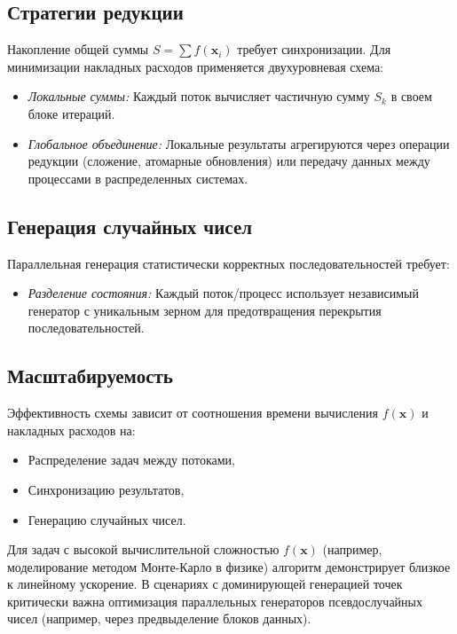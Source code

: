 \documentclass[a4paper,12pt]{article}
\begin{document}
\subsection{Стратегии редукции}
Накопление общей суммы \( S = \sum f(\mathbf{x}_i) \) требует синхронизации. Для минимизации накладных расходов применяется двухуровневая схема:
\begin{itemize}
\item \textit{Локальные суммы:} Каждый поток вычисляет частичную сумму \( S_k \) в своем блоке итераций.
\item \textit{Глобальное объединение:} Локальные результаты агрегируются через операции редукции (сложение, атомарные обновления) или передачу данных между процессами в распределенных системах.
\end{itemize}

\subsection{Генерация случайных чисел}
Параллельная генерация статистически корректных последовательностей требует:
\begin{itemize}
\item \textit{Разделение состояния:} Каждый поток/процесс использует независимый генератор с уникальным зерном для предотвращения перекрытия последовательностей.
\end{itemize}

\subsection{Масштабируемость}
Эффективность схемы зависит от соотношения времени вычисления \( f(\mathbf{x}) \) и накладных расходов на:
\begin{itemize}
\item Распределение задач между потоками,
\item Синхронизацию результатов,
\item Генерацию случайных чисел.
\end{itemize}

Для задач с высокой вычислительной сложностью \( f(\mathbf{x}) \) (например, моделирование методом Монте-Карло в физике) алгоритм демонстрирует близкое к линейному ускорение. В сценариях с доминирующей генерацией точек критически важна оптимизация параллельных генераторов псевдослучайных чисел (например, через предвыделение блоков данных). 

\newpage
\end{document}
